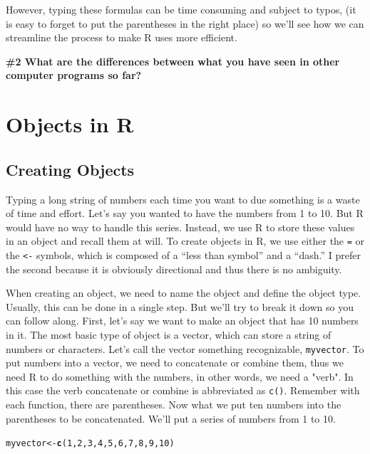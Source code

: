 \documentclass{tufte-handout}\usepackage[]{graphicx}\usepackage[]{xcolor}
\makeatletter
\newcommand{\hlnum}[1]{\textcolor[rgb]{0.686,0.059,0.569}{#1}}%
\newcommand{\hlstd}[1]{\textcolor[rgb]{0.345,0.345,0.345}{#1}}%
\newcommand{\hlkwb}[1]{\textcolor[rgb]{0.69,0.353,0.396}{#1}}%
\newcommand{\hlkwd}[1]{\textcolor[rgb]{0.737,0.353,0.396}{\textbf{#1}}}%
\newenvironment{kframe}{%
 \def\at@end@of@kframe{}%
 \ifinner\ifhmode%
  \def\at@end@of@kframe{\end{minipage}}%
  \begin{minipage}{\columnwidth}%
 \fi\fi%
 \def\FrameCommand##1{\hskip\@totalleftmargin \hskip-\fboxsep
 \colorbox{shadecolor}{##1}\hskip-\fboxsep
     \hskip-\linewidth \hskip-\@totalleftmargin \hskip\columnwidth}%
 \MakeFramed {\advance\hsize-\width
   \@totalleftmargin\z@ \linewidth\hsize
   \@setminipage}}%
 {\par\unskip\endMakeFramed%
 \at@end@of@kframe}
\newenvironment{knitrout}{}{} %
\makeatother
\begin{document}
However, typing these formulas can be time consuming and subject to typos, (\eg it is easy to forget to put the parentheses in the right place) so we'll see how we can streamline the process to make R uses more efficient. 

\bigskip
\noindent \textbf{\#2 What are the differences between what you have seen in other computer programs so far? }

\section{Objects in R}

\subsection{Creating Objects}

Typing a long string of numbers each time you want to due something is a waste of time and effort. Let's say you wanted to have the numbers from 1 to 10. But R would have no way to handle this series. Instead, we use R to store these values in an object and recall them at will. To create objects in R, we use either the \texttt{=} or the \texttt{<-} symbols, which is composed of a ``less than symbol'' and a ``dash.'' I prefer the second because it is obviously directional and thus there is no ambiguity.

When creating an object, we need to name the object and define the object type. Usually, this can be done in a single step. But we'll try to break it down so you can follow along. First, let's say we want to make an object that has 10 numbers in it. The most basic type of object is a vector, which can store a string of numbers or characters. Let's call the vector something recognizable, \texttt{myvector}. To put numbers into a vector, we need to concatenate or combine them, thus we need R to do something with the numbers, in other words, we need a "verb". In this case the verb concatenate or combine is abbreviated as \texttt{c()}. Remember with each function, there are parentheses. Now what we put ten numbers into the parentheses to be concatenated. We'll put a series of numbers from 1 to 10. 

\begin{knitrout}
\color{fgcolor}\begin{kframe}
\begin{alltt}
\hlstd{myvector} \hlkwb{<-} \hlkwd{c}\hlstd{(}\hlnum{1}\hlstd{,} \hlnum{2}\hlstd{,} \hlnum{3}\hlstd{,} \hlnum{4}\hlstd{,} \hlnum{5}\hlstd{,} \hlnum{6}\hlstd{,} \hlnum{7}\hlstd{,} \hlnum{8}\hlstd{,} \hlnum{9}\hlstd{,} \hlnum{10}\hlstd{)}
\end{alltt}
\end{kframe}
\end{knitrout}
\end{document}
